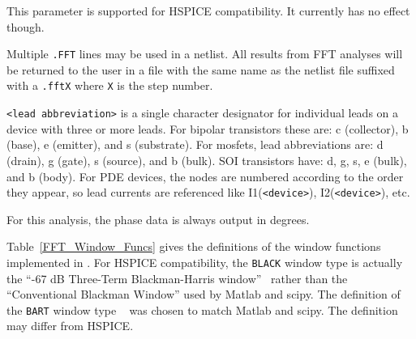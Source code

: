\begin{Command}
\begin {Arguments}
This parameter is supported for HSPICE compatibility. It currently
has no effect though.

\end{Arguments}

\comments
Multiple \texttt{.FFT} lines may be used in a netlist.  All results from FFT analyses
will be returned to the user in a file with the same name as the netlist file suffixed
with a \texttt{.fftX} where {\tt X} is the step number.

\texttt{<lead abbreviation>} is a single character designator for individual
leads on a device with three or more leads.  For bipolar transistors these are:
c (collector), b (base), e (emitter), and s (substrate).  For mosfets, lead
abbreviations are: d (drain), g (gate), s (source), and b (bulk).  SOI
transistors have: d, g, s, e (bulk), and b (body).  For PDE devices, the nodes
are numbered according to the order they appear, so lead currents are
referenced like I1(\texttt{<device>}), I2(\texttt{<device>}), etc.

For this analysis, the phase data is always output in degrees.

\end{Command}

Table~\ref{FFT_Window_Funcs} gives the definitions of the window functions
implemented in \Xyce{}.  For HSPICE compatibility, the {\tt BLACK} window type
is actually the ``-67 dB Three-Term Blackman-Harris window''~\cite{Doerry2017}
rather than the ``Conventional Blackman Window'' used by Matlab and scipy.
The definition of the {\tt BART} window type ~\cite{oppenheimSchafer} was chosen
to match Matlab and scipy.  The \Xyce{} definition may differ from HSPICE.

